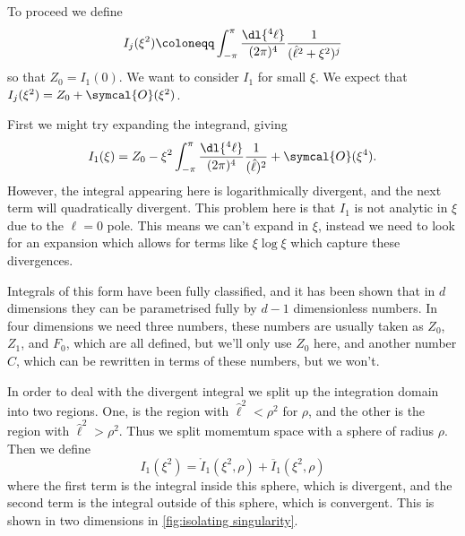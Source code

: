 \documentclass[fleqn]{NotesClass}
\newcommand{\order}{\symcal{O}}
\begin{document}
    To proceed we define
    \begin{equation}
        I_j(\xi^2) \coloneqq \int_{-\pi}^{\pi} \frac{\dl{^4\ell}}{(2\pi)^4} \frac{1}{(\hat{\ell}^2 + \xi^2)^j}
    \end{equation}
    so that \(Z_0 = I_1(0)\).
    We want to consider \(I_1\) for small \(\xi\).
    We expect that \(I_j(\xi^2) = Z_0 + \order(\xi^2)\).
    
    First we might try expanding the integrand, giving
    \begin{equation}
        I_1(\xi) = Z_0 - \xi^2 \int_{-\pi}^{\pi} \frac{\dl{^4\ell}}{(2\pi)^4} \frac{1}{(\hat{\ell})^2} + \order(\xi^4).
    \end{equation}
    However, the integral appearing here is logarithmically divergent, and the next term will quadratically divergent.
    This problem here is that \(I_1\) is not analytic in \(\xi\) due to the \(\ell = 0\) pole.
    This means we can't expand in \(\xi\), instead we need to look for an expansion which allows for terms like \(\xi\log\xi\) which capture these divergences.
    
    Integrals of this form have been fully classified, and it has been shown that in \(d\) dimensions they can be parametrised fully by \(d - 1\) dimensionless numbers.
    In four dimensions we need three numbers, these numbers are usually taken as \(Z_0\), \(Z_1\), and \(F_0\), which are all defined, but we'll only use \(Z_0\) here, and another number \(C\), which can be rewritten in terms of these numbers, but we won't.
    
    In order to deal with the divergent integral we split up the integration domain into two regions.
    One, is the region with \(\hat{\ell}^2 < \rho^2\) for \(\rho\), and the other is the region with \(\hat{\ell}^2 > \rho^2\).
    Thus we split momemtum space with a sphere of radius \(\rho\).
    Then we define
    \begin{equation}
        I_1(\xi^2) = \mathring{I}_1(\xi^2, \rho) + \overbar{I}_1(\xi^2, \rho)
    \end{equation}
    where the first term is the integral inside this sphere, which is divergent, and the second term is the integral outside of this sphere, which is convergent.
    This is shown in two dimensions in \cref{fig:isolating singularity}.
    
\end{document}
